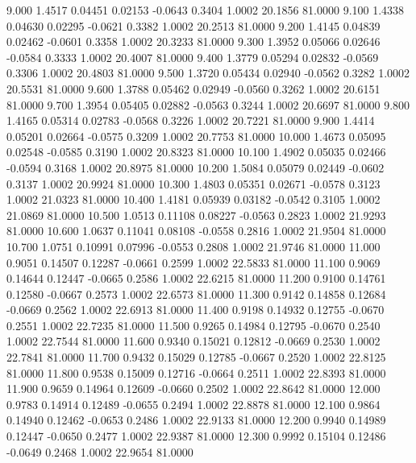    9.000   1.4517   0.04451   0.02153  -0.0643   0.3404   1.0002  20.1856  81.0000
   9.100   1.4338   0.04630   0.02295  -0.0621   0.3382   1.0002  20.2513  81.0000
   9.200   1.4145   0.04839   0.02462  -0.0601   0.3358   1.0002  20.3233  81.0000
   9.300   1.3952   0.05066   0.02646  -0.0584   0.3333   1.0002  20.4007  81.0000
   9.400   1.3779   0.05294   0.02832  -0.0569   0.3306   1.0002  20.4803  81.0000
   9.500   1.3720   0.05434   0.02940  -0.0562   0.3282   1.0002  20.5531  81.0000
   9.600   1.3788   0.05462   0.02949  -0.0560   0.3262   1.0002  20.6151  81.0000
   9.700   1.3954   0.05405   0.02882  -0.0563   0.3244   1.0002  20.6697  81.0000
   9.800   1.4165   0.05314   0.02783  -0.0568   0.3226   1.0002  20.7221  81.0000
   9.900   1.4414   0.05201   0.02664  -0.0575   0.3209   1.0002  20.7753  81.0000
  10.000   1.4673   0.05095   0.02548  -0.0585   0.3190   1.0002  20.8323  81.0000
  10.100   1.4902   0.05035   0.02466  -0.0594   0.3168   1.0002  20.8975  81.0000
  10.200   1.5084   0.05079   0.02449  -0.0602   0.3137   1.0002  20.9924  81.0000
  10.300   1.4803   0.05351   0.02671  -0.0578   0.3123   1.0002  21.0323  81.0000
  10.400   1.4181   0.05939   0.03182  -0.0542   0.3105   1.0002  21.0869  81.0000
  10.500   1.0513   0.11108   0.08227  -0.0563   0.2823   1.0002  21.9293  81.0000
  10.600   1.0637   0.11041   0.08108  -0.0558   0.2816   1.0002  21.9504  81.0000
  10.700   1.0751   0.10991   0.07996  -0.0553   0.2808   1.0002  21.9746  81.0000
  11.000   0.9051   0.14507   0.12287  -0.0661   0.2599   1.0002  22.5833  81.0000
  11.100   0.9069   0.14644   0.12447  -0.0665   0.2586   1.0002  22.6215  81.0000
  11.200   0.9100   0.14761   0.12580  -0.0667   0.2573   1.0002  22.6573  81.0000
  11.300   0.9142   0.14858   0.12684  -0.0669   0.2562   1.0002  22.6913  81.0000
  11.400   0.9198   0.14932   0.12755  -0.0670   0.2551   1.0002  22.7235  81.0000
  11.500   0.9265   0.14984   0.12795  -0.0670   0.2540   1.0002  22.7544  81.0000
  11.600   0.9340   0.15021   0.12812  -0.0669   0.2530   1.0002  22.7841  81.0000
  11.700   0.9432   0.15029   0.12785  -0.0667   0.2520   1.0002  22.8125  81.0000
  11.800   0.9538   0.15009   0.12716  -0.0664   0.2511   1.0002  22.8393  81.0000
  11.900   0.9659   0.14964   0.12609  -0.0660   0.2502   1.0002  22.8642  81.0000
  12.000   0.9783   0.14914   0.12489  -0.0655   0.2494   1.0002  22.8878  81.0000
  12.100   0.9864   0.14940   0.12462  -0.0653   0.2486   1.0002  22.9133  81.0000
  12.200   0.9940   0.14989   0.12447  -0.0650   0.2477   1.0002  22.9387  81.0000
  12.300   0.9992   0.15104   0.12486  -0.0649   0.2468   1.0002  22.9654  81.0000
